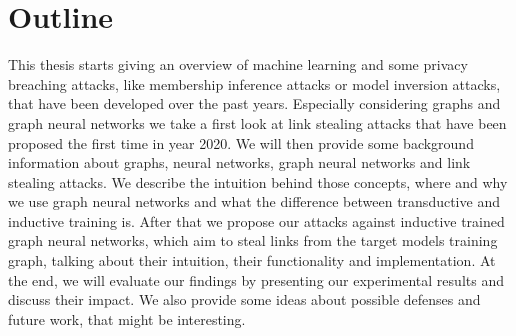 	\section{Outline}
		This thesis starts giving an overview of machine learning and some privacy breaching attacks, like membership inference attacks or model inversion attacks, that have been developed over the past years.
		Especially considering graphs and graph neural networks we take a first look at link stealing attacks that have been proposed the first time in year 2020.
		We will then provide some background information about graphs, neural networks, graph neural networks and link stealing attacks.
		We describe the intuition behind those concepts, where and why we use graph neural networks and what the difference between transductive and inductive training is.
		After that we propose our attacks against inductive trained graph neural networks, which aim to steal links from the target models training graph, talking about their intuition, their functionality and implementation.
		At the end, we will evaluate our findings by presenting our experimental results and discuss their impact.
		We also provide some ideas about possible defenses and future work, that might be interesting.